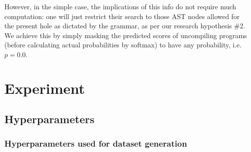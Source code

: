 \documentclass{article}
\begin{document}
However, in the simple case, the implications of this info do not require much computation:
one will just restrict their search to those AST nodes allowed for the present hole as dictated by the grammar,
as per our research hypothesis \#2.
We achieve this by simply masking the predicted scores of uncompiling programs
(before calculating actual probabilities by softmax) to have any probability, i.e. $p=0.0$.


\section{Experiment} \label{sec:experiment}


\subsection{Hyperparameters}

\subsubsection{Hyperparameters used for dataset generation}
\end{document}
